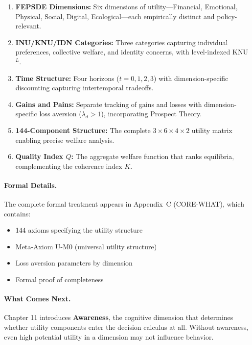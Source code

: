 \begin{enumerate}
    \item \textbf{FEPSDE Dimensions:} Six dimensions of utility---Financial, Emotional,
          Physical, Social, Digital, Ecological---each empirically distinct and policy-relevant.

    \item \textbf{INU/KNU/IDN Categories:} Three categories capturing individual preferences,
          collective welfare, and identity concerns, with level-indexed KNU$^L$.

    \item \textbf{Time Structure:} Four horizons ($t = 0, 1, 2, 3$) with dimension-specific
          discounting capturing intertemporal tradeoffs.

    \item \textbf{Gains and Pains:} Separate tracking of gains and losses with dimension-specific
          loss aversion ($\lambda_d > 1$), incorporating Prospect Theory.

    \item \textbf{144-Component Structure:} The complete $3 \times 6 \times 4 \times 2$
          utility matrix enabling precise welfare analysis.

    \item \textbf{Quality Index $Q$:} The aggregate welfare function that ranks equilibria,
          complementing the coherence index $K$.
\end{enumerate}

\paragraph{Formal Details.}
The complete formal treatment appears in Appendix~C (CORE-WHAT), which contains:
\begin{itemize}[nosep]
    \item 144 axioms specifying the utility structure
    \item Meta-Axiom U-M0 (universal utility structure)
    \item Loss aversion parameters by dimension
    \item Formal proof of completeness
\end{itemize}

\paragraph{What Comes Next.}
Chapter 11 introduces \textbf{Awareness}, the cognitive dimension that determines
whether utility components enter the decision calculus at all. Without awareness,
even high potential utility in a dimension may not influence behavior.

